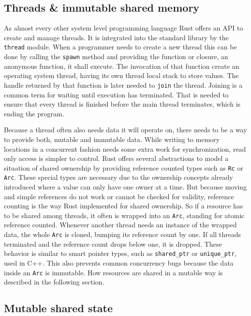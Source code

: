 \subsection{Threads \& immutable shared memory}

As almost every other system level programming language Rust offers an \ac{API} to create and manage threads. It is integrated into the standard library by the \texttt{thread} module. When a programmer needs to create a new thread this can be done by calling the \texttt{spawn} method and providing the function or closure, an anonymous function, it shall execute. The invocation of that function create an operating system thread, having its own thread local stack to store values. The handle returned by that function is later needed to \texttt{join} the thread. Joining is a common term for waiting until execution has terminated. That is needed to ensure that every thread is finished before the main thread terminates, which is ending the program.

Because a thread often also needs data it will operate on, there needs to be a way to provide both, mutable and immutable data. While writing to memory locations in a concurrent fashion needs some extra work for synchronization, read only access is simpler to control. Rust offers several abstractions to model a situation of shared ownership by providing reference counted types such as \texttt{Rc} or \texttt{Arc}. These special types are necessary due to the ownership concepts already introduced where a value can only have one owner at a time. But because moving and simple references do not work or cannot be checked for validity, reference counting is the way Rust implemented for shared ownership. So if a resource has to be shared among threads, it often is wrapped into an \texttt{Arc}, standing for atomic reference counted. Whenever another thread needs an instance of the wrapped data, the whole \texttt{Arc} is cloned, bumping its reference count by one. If all threads terminated and the reference count drops below one, it is dropped. These behavior is similar to smart pointer types, such as \texttt{shared\_ptr} or \texttt{unique\_ptr}, used in C++. This also prevents common concurrency bugs because the data inside an \texttt{Arc} is immutable. How resources are shared in a mutable way is described in the following section.

\subsection{Mutable shared state}

